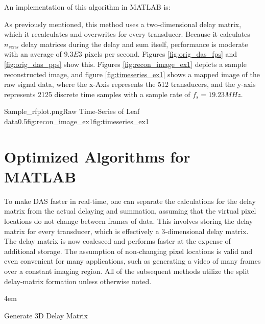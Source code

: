     An implementation of this algorithm in MATLAB is:

    


    As previously mentioned, this method uses a two-dimensional delay matrix, which it recalculates and overwrites for every transducer. Because it calculates $n_{sens}$ delay matrices during the delay and sum itself, performance is moderate with an average of $9.3E3$ pixels per second. Figures \ref{fig:orig_das_fps} and \ref{fig:orig_das_pps} show this. Figures \ref{fig:recon_image_ex1} depicts a sample reconstructed image, and figure \ref{fig:timeseries_ex1} shows a mapped image of the raw signal data, where the x-Axis represents the 512 transducers, and the y-axis represents 2125 discrete time samples with a sample rate of $f_s = 19.23 MHz$.

    {Sample_rfplot.png}{Raw Time-Series of Leaf data}{0.5}{fig:recon_image_ex1}{fig:timeseries_ex1}

\section{Optimized Algorithms for MATLAB}
\label{chapter3:optimized_matlab}

    To make DAS faster in real-time, one can separate the calculations for the delay matrix from the actual delaying and summation, assuming that the virtual pixel locations do not change between frames of data. This involves storing the delay matrix for every transducer, which is effectively a 3-dimensional delay matrix. The delay matrix is now coalesced and performs faster at the expense of additional storage. The assumption of non-changing pixel locations is valid and even convenient for many applications, such as generating a video of many frames over a constant imaging region. All of the subsequent methods utilize the split delay-matrix formation unless otherwise noted.

    \begin{algorithm} [H]
        \parindent4em
        \normalem
        \caption{Generate 3D Delay Matrix}\label{algo:3d_indmat}
        \end{algorithm}

